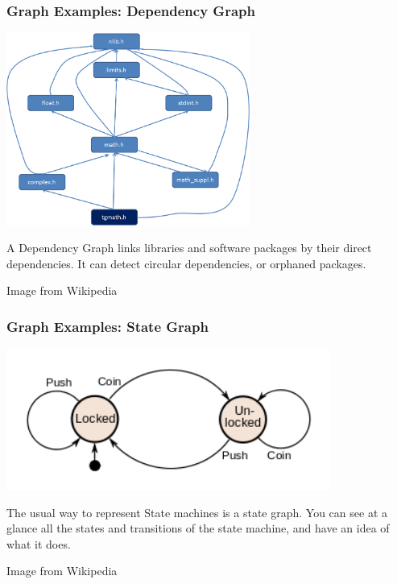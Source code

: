 \documentclass{beamer}
\begin{document}
\begin{frame}
  \frametitle{Graph Examples: Dependency Graph}
  \begin{center}
    \includegraphics[width=0.6\textwidth]{img/dependencygraph}
  \end{center}  
  \begin{block}{}
    {\small A Dependency Graph links libraries and software packages by their
    direct dependencies. It can detect circular dependencies, or
    orphaned packages.}
  \end{block}
  \hfill\tiny{Image from Wikipedia}
\end{frame}

\begin{frame}
  \frametitle{Graph Examples: State Graph}
  \begin{center}
    \includegraphics[width=0.8\textwidth]{img/stategraph}
  \end{center}  
  \begin{block}{}
    {\small The usual way to represent State machines is a state graph. You
    can see at a glance all the states and transitions of the state
    machine, and have an idea of what it does.}
  \end{block}
  \hfill\tiny{Image from Wikipedia}
\end{frame}
\end{document}
